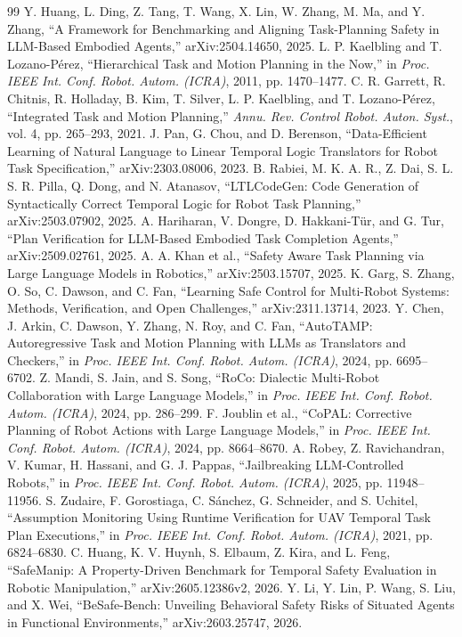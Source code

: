 \begin{thebibliography}{99}
 Y. Huang, L. Ding, Z. Tang, T. Wang, X. Lin, W. Zhang, M. Ma, and Y. Zhang, ``A Framework for Benchmarking and Aligning Task-Planning Safety in LLM-Based Embodied Agents,'' arXiv:2504.14650, 2025.
 L. P. Kaelbling and T. Lozano-P\'erez, ``Hierarchical Task and Motion Planning in the Now,'' in \emph{Proc. IEEE Int. Conf. Robot. Autom. (ICRA)}, 2011, pp. 1470--1477.
 C. R. Garrett, R. Chitnis, R. Holladay, B. Kim, T. Silver, L. P. Kaelbling, and T. Lozano-P\'erez, ``Integrated Task and Motion Planning,'' \emph{Annu. Rev. Control Robot. Auton. Syst.}, vol. 4, pp. 265--293, 2021.
 J. Pan, G. Chou, and D. Berenson, ``Data-Efficient Learning of Natural Language to Linear Temporal Logic Translators for Robot Task Specification,'' arXiv:2303.08006, 2023.
 B. Rabiei, M. K. A. R., Z. Dai, S. L. S. R. Pilla, Q. Dong, and N. Atanasov, ``LTLCodeGen: Code Generation of Syntactically Correct Temporal Logic for Robot Task Planning,'' arXiv:2503.07902, 2025.
 A. Hariharan, V. Dongre, D. Hakkani-T\"ur, and G. Tur, ``Plan Verification for LLM-Based Embodied Task Completion Agents,'' arXiv:2509.02761, 2025.
 A. A. Khan et al., ``Safety Aware Task Planning via Large Language Models in Robotics,'' arXiv:2503.15707, 2025.
 K. Garg, S. Zhang, O. So, C. Dawson, and C. Fan, ``Learning Safe Control for Multi-Robot Systems: Methods, Verification, and Open Challenges,'' arXiv:2311.13714, 2023.
 Y. Chen, J. Arkin, C. Dawson, Y. Zhang, N. Roy, and C. Fan, ``AutoTAMP: Autoregressive Task and Motion Planning with LLMs as Translators and Checkers,'' in \emph{Proc. IEEE Int. Conf. Robot. Autom. (ICRA)}, 2024, pp. 6695--6702.
 Z. Mandi, S. Jain, and S. Song, ``RoCo: Dialectic Multi-Robot Collaboration with Large Language Models,'' in \emph{Proc. IEEE Int. Conf. Robot. Autom. (ICRA)}, 2024, pp. 286--299.
 F. Joublin et al., ``CoPAL: Corrective Planning of Robot Actions with Large Language Models,'' in \emph{Proc. IEEE Int. Conf. Robot. Autom. (ICRA)}, 2024, pp. 8664--8670.
 A. Robey, Z. Ravichandran, V. Kumar, H. Hassani, and G. J. Pappas, ``Jailbreaking LLM-Controlled Robots,'' in \emph{Proc. IEEE Int. Conf. Robot. Autom. (ICRA)}, 2025, pp. 11948--11956.
 S. Zudaire, F. Gorostiaga, C. S\'anchez, G. Schneider, and S. Uchitel, ``Assumption Monitoring Using Runtime Verification for UAV Temporal Task Plan Executions,'' in \emph{Proc. IEEE Int. Conf. Robot. Autom. (ICRA)}, 2021, pp. 6824--6830.
 C. Huang, K. V. Huynh, S. Elbaum, Z. Kira, and L. Feng, ``SafeManip: A Property-Driven Benchmark for Temporal Safety Evaluation in Robotic Manipulation,'' arXiv:2605.12386v2, 2026.
 Y. Li, Y. Lin, P. Wang, S. Liu, and X. Wei, ``BeSafe-Bench: Unveiling Behavioral Safety Risks of Situated Agents in Functional Environments,'' arXiv:2603.25747, 2026.
\end{thebibliography}
